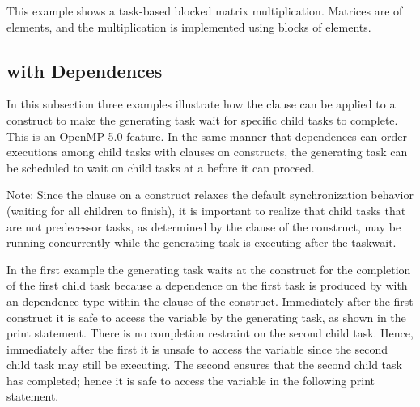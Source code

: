This example shows a task-based blocked matrix multiplication. Matrices are of 
 elements, and the multiplication is implemented using blocks
of  elements.

\clearpage


\subsection{ with Dependences}
\label{subsec:taskwait_depend}

In this subsection three examples illustrate how the
 clause can be applied to a  construct to make the
generating task wait for specific child tasks to complete. This is an OpenMP 5.0 feature.
 In the same manner that
dependences can order executions among child tasks with  clauses on
 constructs, the generating task can be scheduled to wait on child tasks
at a  before it can proceed.

Note: Since the  clause on a  construct relaxes the
default synchronization behavior (waiting for all children to finish), it is important to
realize that child tasks that are not predecessor tasks, as determined by the 
clause of the  construct, may be running concurrently while the
generating task is executing after the taskwait.

In the first example the generating task waits at the  construct
for the completion of the first child task because a dependence on the first task
is produced by  with an  dependence type within the 
clause of the  construct.
Immediately after the first  construct it is safe to access the
 variable by the generating task, as shown in the print statement.
There is no completion restraint on the second child task.
Hence, immediately after the first  it is unsafe to access the
 variable since the second child task may still be executing.
The second  ensures that the second child task has completed; hence
it is safe to access the  variable in the following print statement.

